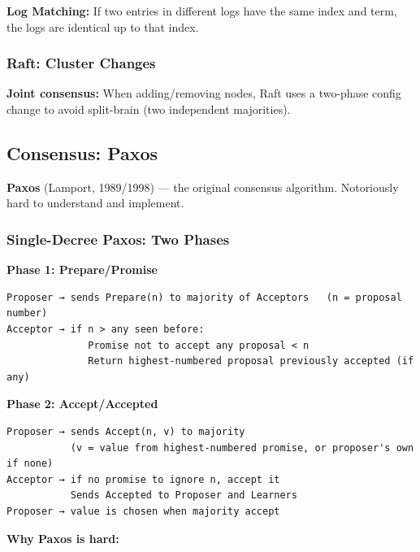 \documentclass[11pt]{article}
\begin{document}
\textbf{Log Matching:} If two entries in different logs have the same index and term, the logs are identical up to that index.

\subsubsection{Raft: Cluster Changes}\label{raft-cluster-changes}

\textbf{Joint consensus:} When adding/removing nodes, Raft uses a two-phase config change to avoid split-brain (two independent majorities).

\subsection{Consensus: Paxos}\label{consensus-paxos}

\textbf{Paxos} (Lamport, 1989/1998) --- the original consensus algorithm. Notoriously hard to understand and implement.

\subsubsection{Single-Decree Paxos: Two Phases}\label{single-decree-paxos-two-phases}

\textbf{Phase 1: Prepare/Promise}

\setcodelang{}

\begin{verbatim}
Proposer → sends Prepare(n) to majority of Acceptors   (n = proposal number)
Acceptor → if n > any seen before:
              Promise not to accept any proposal < n
              Return highest-numbered proposal previously accepted (if any)
\end{verbatim}

\textbf{Phase 2: Accept/Accepted}

\setcodelang{}

\begin{verbatim}
Proposer → sends Accept(n, v) to majority
           (v = value from highest-numbered promise, or proposer's own if none)
Acceptor → if no promise to ignore n, accept it
           Sends Accepted to Proposer and Learners
Proposer → value is chosen when majority accept
\end{verbatim}

\textbf{Why Paxos is hard:}
\end{document}
